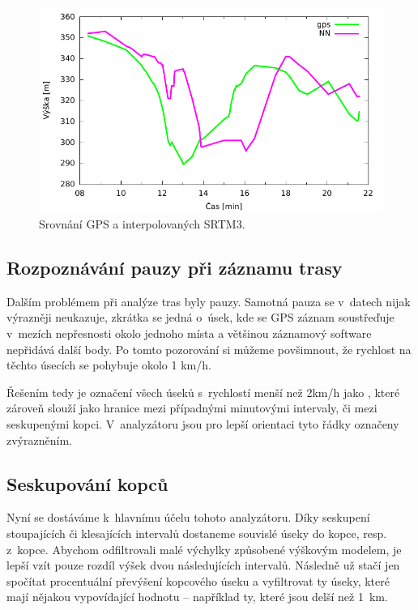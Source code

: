 \documentclass[thesis=B,czech]{FITthesis}[2012/06/26]
\begin{document}
 \begin{figure}[p]\centering
 	\includegraphics[page=2]{grafy/porovnani.pdf}
 	\caption{Srovnání GPS a interpolovaných SRTM3.}
 	\label{img:gpsporovnaniok}
 	
 \end{figure}



\subsection{Rozpoznávání pauzy při záznamu trasy}
Dalším problémem při analýze tras byly pauzy. Samotná pauza se v~datech nijak výrazněji neukazuje, zkrátka se jedná o~úsek, kde se GPS záznam soustřeďuje v~mezích nepřesnosti okolo jednoho místa a většinou záznamový software nepřidává další body. Po tomto pozorování si můžeme povšimnout, že rychlost na těchto  úsecích se pohybuje okolo 1 km/h. 

Řešením tedy je označení všech úseků s~rychlostí menší než 2km/h jako , které zároveň slouží jako hranice mezi případnými minutovými intervaly, či mezi seskupenými kopci. V~analyzátoru jsou pro lepší orientaci tyto řádky označeny zvýrazněním.

\subsection{Seskupování kopců}
Nyní se dostáváme k~hlavnímu účelu tohoto analyzátoru. Díky seskupení stoupajících či klesajících intervalů dostaneme souvislé úseky do kopce, resp. z~kopce. Abychom odfiltrovali malé výchylky způsobené výškovým modelem, je lepší vzít pouze rozdíl výšek dvou následujících intervalů. Následně už stačí jen spočítat procentuální převýšení kopcového úseku a vyfiltrovat ty úseky, které mají nějakou vypovídající hodnotu -- například ty, které jsou delší než 1~km.
\end{document}
